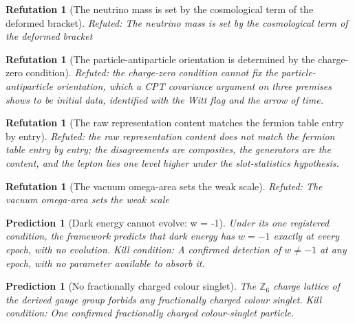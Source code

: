 \documentclass[11pt]{article}
\newtheorem{refutation}[theorem]{Refutation}
\newtheorem{prediction}[theorem]{Prediction}
\theoremstyle{definition}
\theoremstyle{plain}
\begin{document}
\begin{refutation}[The neutrino mass is set by the cosmological term of the deformed bracket]\label{c:refuted.the-neutrino-mass-is-set-by-the-cosmological-ter}
Refuted: The neutrino mass is set by the cosmological term of the deformed bracket
\end{refutation}

\begin{refutation}[The particle-antiparticle orientation is determined by the charge-zero condition]\label{c:refuted.the-particle-antiparticle-orientation-is-determi}
Refuted: the charge-zero condition cannot fix the particle-antiparticle orientation, which a CPT covariance argument on three premises shows to be initial data, identified with the Witt flag and the arrow of time.
\end{refutation}

\begin{refutation}[The raw representation content matches the fermion table entry by entry]\label{c:refuted.the-raw-representation-content-matches-the-fermi}
Refuted: the raw representation content does not match the fermion table entry by entry; the disagreements are composites, the generators are the content, and the lepton lies one level higher under the slot-statistics hypothesis.
\end{refutation}

\begin{refutation}[The vacuum omega-area sets the weak scale]\label{c:refuted.the-vacuum-omega-area-sets-the-weak-scale}
Refuted: The vacuum omega-area sets the weak scale
\end{refutation}

\begin{prediction}[Dark energy cannot evolve: w = -1]\label{c:pred.dark-energy-w-minus-one}
Under its one registered condition, the framework predicts that dark energy has $w = -1$ exactly at every epoch, with no evolution.
\emph{Kill condition:} A confirmed detection of $w \neq -1$ at any epoch, with no parameter available to absorb it.
\end{prediction}

\begin{prediction}[No fractionally charged colour singlet]\label{c:pred.z6-charge-lattice}
The $\mathbb{Z}_{6}$ charge lattice of the derived gauge group forbids any fractionally charged colour singlet.
\emph{Kill condition:} One confirmed fractionally charged colour-singlet particle.
\end{prediction}
\end{document}

